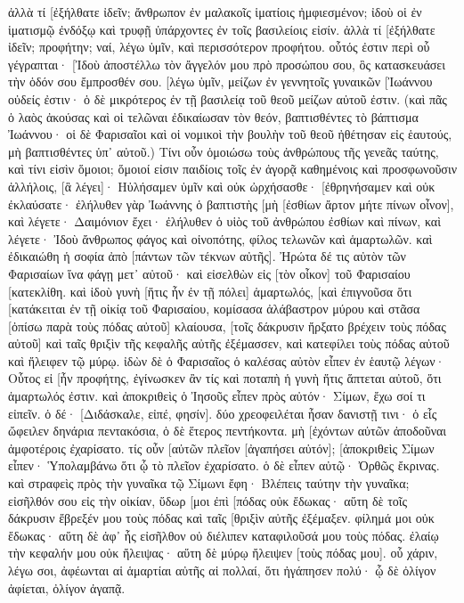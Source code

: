 ἀλλὰ τί [ἐξήλθατε ἰδεῖν; ἄνθρωπον ἐν μαλακοῖς ἱματίοις ἠμφιεσμένον; ἰδοὺ οἱ ἐν ἱματισμῷ ἐνδόξῳ καὶ τρυφῇ ὑπάρχοντες ἐν τοῖς βασιλείοις εἰσίν. 
ἀλλὰ τί [ἐξήλθατε ἰδεῖν; προφήτην; ναί, λέγω ὑμῖν, καὶ περισσότερον προφήτου. 
οὗτός ἐστιν περὶ οὗ γέγραπται· [Ἰδοὺ ἀποστέλλω τὸν ἄγγελόν μου πρὸ προσώπου σου, ὃς κατασκευάσει τὴν ὁδόν σου ἔμπροσθέν σου. 
[λέγω ὑμῖν, μείζων ἐν γεννητοῖς γυναικῶν [Ἰωάννου οὐδείς ἐστιν· ὁ δὲ μικρότερος ἐν τῇ βασιλείᾳ τοῦ θεοῦ μείζων αὐτοῦ ἐστιν. 
(καὶ πᾶς ὁ λαὸς ἀκούσας καὶ οἱ τελῶναι ἐδικαίωσαν τὸν θεόν, βαπτισθέντες τὸ βάπτισμα Ἰωάννου· 
οἱ δὲ Φαρισαῖοι καὶ οἱ νομικοὶ τὴν βουλὴν τοῦ θεοῦ ἠθέτησαν εἰς ἑαυτούς, μὴ βαπτισθέντες ὑπ᾽ αὐτοῦ.) 
Τίνι οὖν ὁμοιώσω τοὺς ἀνθρώπους τῆς γενεᾶς ταύτης, καὶ τίνι εἰσὶν ὅμοιοι; 
ὅμοιοί εἰσιν παιδίοις τοῖς ἐν ἀγορᾷ καθημένοις καὶ προσφωνοῦσιν ἀλλήλοις, [ἃ λέγει]· Ηὐλήσαμεν ὑμῖν καὶ οὐκ ὠρχήσασθε· [ἐθρηνήσαμεν καὶ οὐκ ἐκλαύσατε· 
ἐλήλυθεν γὰρ Ἰωάννης ὁ βαπτιστὴς [μὴ [ἐσθίων ἄρτον μήτε πίνων οἶνον], καὶ λέγετε· Δαιμόνιον ἔχει· 
ἐλήλυθεν ὁ υἱὸς τοῦ ἀνθρώπου ἐσθίων καὶ πίνων, καὶ λέγετε· Ἰδοὺ ἄνθρωπος φάγος καὶ οἰνοπότης, φίλος τελωνῶν καὶ ἁμαρτωλῶν. 
καὶ ἐδικαιώθη ἡ σοφία ἀπὸ [πάντων τῶν τέκνων αὐτῆς]. 
Ἠρώτα δέ τις αὐτὸν τῶν Φαρισαίων ἵνα φάγῃ μετ᾽ αὐτοῦ· καὶ εἰσελθὼν εἰς [τὸν οἶκον] τοῦ Φαρισαίου [κατεκλίθη. 
καὶ ἰδοὺ γυνὴ [ἥτις ἦν ἐν τῇ πόλει] ἁμαρτωλός, [καὶ ἐπιγνοῦσα ὅτι [κατάκειται ἐν τῇ οἰκίᾳ τοῦ Φαρισαίου, κομίσασα ἀλάβαστρον μύρου 
καὶ στᾶσα [ὀπίσω παρὰ τοὺς πόδας αὐτοῦ] κλαίουσα, [τοῖς δάκρυσιν ἤρξατο βρέχειν τοὺς πόδας αὐτοῦ] καὶ ταῖς θριξὶν τῆς κεφαλῆς αὐτῆς ἐξέμασσεν, καὶ κατεφίλει τοὺς πόδας αὐτοῦ καὶ ἤλειφεν τῷ μύρῳ. 
ἰδὼν δὲ ὁ Φαρισαῖος ὁ καλέσας αὐτὸν εἶπεν ἐν ἑαυτῷ λέγων· Οὗτος εἰ [ἦν προφήτης, ἐγίνωσκεν ἂν τίς καὶ ποταπὴ ἡ γυνὴ ἥτις ἅπτεται αὐτοῦ, ὅτι ἁμαρτωλός ἐστιν. 
καὶ ἀποκριθεὶς ὁ Ἰησοῦς εἶπεν πρὸς αὐτόν· Σίμων, ἔχω σοί τι εἰπεῖν. ὁ δέ· [Διδάσκαλε, εἰπέ, φησίν]. 
δύο χρεοφειλέται ἦσαν δανιστῇ τινι· ὁ εἷς ὤφειλεν δηνάρια πεντακόσια, ὁ δὲ ἕτερος πεντήκοντα. 
μὴ [ἐχόντων αὐτῶν ἀποδοῦναι ἀμφοτέροις ἐχαρίσατο. τίς οὖν [αὐτῶν πλεῖον [ἀγαπήσει αὐτόν]; 
[ἀποκριθεὶς Σίμων εἶπεν· Ὑπολαμβάνω ὅτι ᾧ τὸ πλεῖον ἐχαρίσατο. ὁ δὲ εἶπεν αὐτῷ· Ὀρθῶς ἔκρινας. 
καὶ στραφεὶς πρὸς τὴν γυναῖκα τῷ Σίμωνι ἔφη· Βλέπεις ταύτην τὴν γυναῖκα; εἰσῆλθόν σου εἰς τὴν οἰκίαν, ὕδωρ [μοι ἐπὶ [πόδας οὐκ ἔδωκας· αὕτη δὲ τοῖς δάκρυσιν ἔβρεξέν μου τοὺς πόδας καὶ ταῖς [θριξὶν αὐτῆς ἐξέμαξεν. 
φίλημά μοι οὐκ ἔδωκας· αὕτη δὲ ἀφ᾽ ἧς εἰσῆλθον οὐ διέλιπεν καταφιλοῦσά μου τοὺς πόδας. 
ἐλαίῳ τὴν κεφαλήν μου οὐκ ἤλειψας· αὕτη δὲ μύρῳ ἤλειψεν [τοὺς πόδας μου]. 
οὗ χάριν, λέγω σοι, ἀφέωνται αἱ ἁμαρτίαι αὐτῆς αἱ πολλαί, ὅτι ἠγάπησεν πολύ· ᾧ δὲ ὀλίγον ἀφίεται, ὀλίγον ἀγαπᾷ. 
